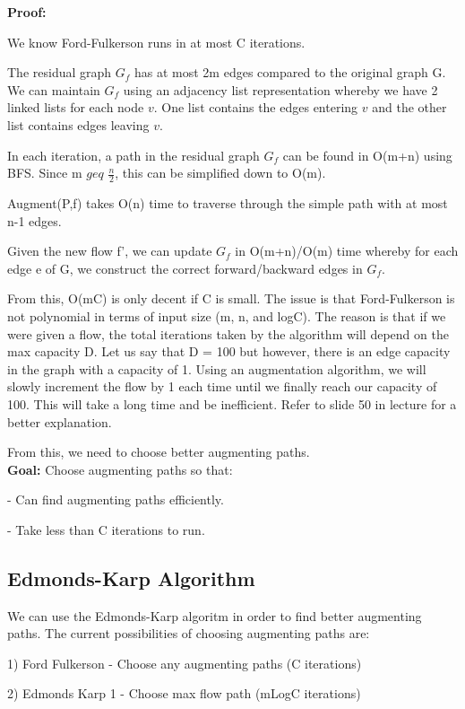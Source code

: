 \documentclass[11pt, oneside]{article}
\theoremstyle{definition}
\begin{document}
\textbf{Proof:}
\begin{addmargin}[1em]{2em}%
  We know Ford-Fulkerson runs in at most C iterations.

  The residual graph $G_f$ has at most 2m edges compared to the original graph G. We can maintain $G_f$ using an adjacency list representation whereby we have 2 linked lists for each node $v$. One list contains the edges entering $v$ and the other list contains edges leaving $v$.

  In each iteration, a path in the residual graph $G_f$ can be found in O(m+n) using BFS. Since m $geq$ $\frac{n}{2}$, this can be simplified down to O(m).

  Augment(P,f) takes O(n) time to traverse through the simple path with at most n-1 edges.

  Given the new flow f', we can update $G_f$ in O(m+n)/O(m) time whereby for each edge e of G, we construct the correct forward/backward edges in $G_f$.
\end{addmargin}

From this, O(mC) is only decent if C is small. The issue is that Ford-Fulkerson is not polynomial in terms of input size (m, n, and logC). The reason is that if we were given a flow, the total iterations taken by the algorithm will depend on the max capacity D. Let us say that D = 100 but however, there is an edge capacity in the graph with a capacity of 1. Using an augmentation algorithm, we will slowly increment the flow by 1 each time until we finally reach our capacity of 100. This will take a long time and be inefficient. Refer to slide 50 in lecture for a better explanation.

From this, we need to choose better augmenting paths.\\

\textbf{Goal:} Choose augmenting paths so that:

- Can find augmenting paths efficiently.

- Take less than C iterations to run.

\subsection{Edmonds-Karp Algorithm}
We can use the Edmonds-Karp algoritm in order to find better augmenting paths. The current possibilities of choosing augmenting paths are:

1) Ford Fulkerson - Choose any augmenting paths (C iterations)

2) Edmonds Karp 1 - Choose max flow path (mLogC iterations)
\end{document}
